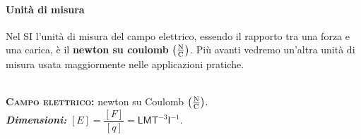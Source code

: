 \paragraph{Unità di misura}
Nel SI l'unità di misura del campo elettrico, essendo il rapporto tra una forza e una carica, è il \textbf{newton su coulomb} $\left(\unit[per-mode = fraction]{\newton\per\coulomb}\right)$. Più avanti vedremo un'altra unità di misura usata maggiormente nelle applicazioni pratiche.
\begin{units}~\\
	\textbf{\textsc{Campo elettrico:}} newton su Coulomb $\left(\unit[per-mode = fraction]{\newton\per\coulomb}\right)$.\\
	\textit{\textbf{Dimensioni:}} $[E]=\dfrac{[F]}{[q]}=\mathsf{L}\mathsf{M}\mathsf{T}^{-3}\mathsf{I}^{-1}$.
\end{units}
